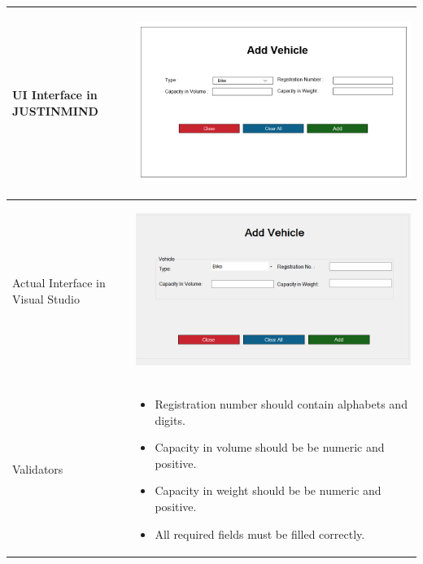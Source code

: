 \documentclass[12pt,a4paper]{article}
\begin{document}
\begin{longtable}{| p{3cm}|p{12cm}|}
UI Interface in JUSTINMIND & \begin{center} \includegraphics[scale=0.3]{./User Interface/UI-023 AddVehicle@1x.png}\end{center}  \\ \hline
Actual Interface in Visual Studio  & \begin{center} \includegraphics[scale=0.3]{./User Interface1/UI-023 AddVehicle@1x.png}\end{center}  \\ \hline

Validators & 
\begin{itemize}
\item   Registration number should contain alphabets and digits.
\item  Capacity in volume should be be numeric and positive. 
\item Capacity in weight should be be numeric and positive. 
\item All required fields must be filled correctly. 

\end{itemize}
\\ \hline
\end{longtable}
\end{document}
